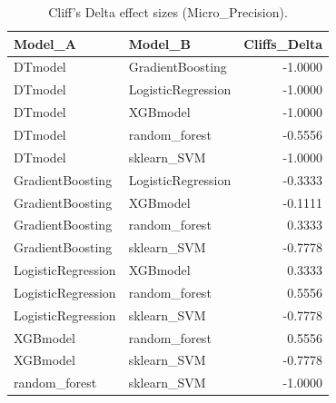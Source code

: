 \begin{table}[t]
\centering
\begin{tabular}{llr}
\toprule
Model_A & Model_B & Cliffs_Delta \\
\midrule
DTmodel & GradientBoosting & -1.0000 \\
DTmodel & LogisticRegression & -1.0000 \\
DTmodel & XGBmodel & -1.0000 \\
DTmodel & random_forest & -0.5556 \\
DTmodel & sklearn_SVM & -1.0000 \\
GradientBoosting & LogisticRegression & -0.3333 \\
GradientBoosting & XGBmodel & -0.1111 \\
GradientBoosting & random_forest & 0.3333 \\
GradientBoosting & sklearn_SVM & -0.7778 \\
LogisticRegression & XGBmodel & 0.3333 \\
LogisticRegression & random_forest & 0.5556 \\
LogisticRegression & sklearn_SVM & -0.7778 \\
XGBmodel & random_forest & 0.5556 \\
XGBmodel & sklearn_SVM & -0.7778 \\
random_forest & sklearn_SVM & -1.0000 \\
\bottomrule
\end{tabular}
\caption{Cliff's Delta effect sizes (Micro_Precision).}
\label{tab:cliffs_Micro_Precision}
\end{table}